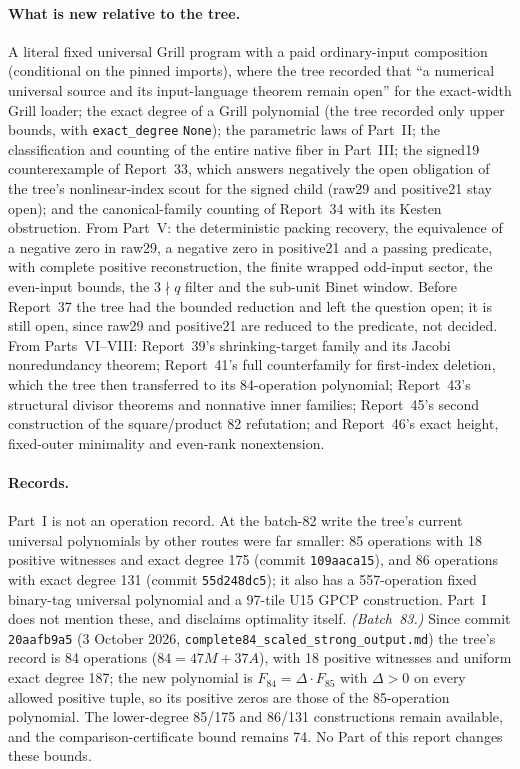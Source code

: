 \documentclass[11pt,letterpaper]{article}
\theoremstyle{definition}\newtheorem{definition}[theorem]{Definition}
\theoremstyle{remark}\newtheorem{remark}[theorem]{Remark}
\newcommand{\rw}[1]{\nolinkurl{#1}}%
\begin{document}
\begin{itemize}
\end{itemize}

\paragraph{What is new relative to the tree.} A literal fixed universal Grill program with a paid ordinary-input composition (conditional on the pinned imports), where the tree recorded that ``a numerical universal source and its input-language theorem remain open'' for the exact-width Grill loader; the exact degree of a Grill polynomial (the tree recorded only upper bounds, with \texttt{exact\_degree} \texttt{None}); the parametric laws of Part~II; the classification and counting of the entire native fiber in Part~III; the signed19 counterexample of Report~33, which answers negatively the open obligation of the tree's nonlinear-index scout for the signed child (raw29 and positive21 stay open); and the canonical-family counting of Report~34 with its Kesten obstruction. From Part~V: the deterministic packing recovery, the equivalence of a negative zero in raw29, a negative zero in positive21 and a passing predicate, with complete positive reconstruction, the finite wrapped odd-input sector, the even-input bounds, the $3\nmid q$ filter and the sub-unit Binet window. Before Report~37 the tree had the bounded reduction and left the question open; it is still open, since raw29 and positive21 are reduced to the predicate, not decided. From Parts~VI--VIII: Report~39's shrinking-target family and its Jacobi nonredundancy theorem; Report~41's full counterfamily for first-index deletion, which the tree then transferred to its 84-operation polynomial; Report~43's structural divisor theorems and nonnative inner families; Report~45's second construction of the square/product 82 refutation; and Report~46's exact height, fixed-outer minimality and even-rank nonextension.

\paragraph{Records.} Part~I is not an operation record. At the batch-82 write the tree's current universal polynomials by other routes were far smaller: 85 operations with 18 positive witnesses and exact degree 175 (commit \texttt{109aaca15}), and 86 operations with exact degree 131 (commit \texttt{55d248dc5}); it also has a 557-operation fixed binary-tag universal polynomial and a 97-tile U15 GPCP construction. Part~I does not mention these, and disclaims optimality itself. \emph{(Batch~83.)} Since commit \texttt{20aafb9a5} (3 October 2026, \rw{complete84_scaled_strong_output.md}) the tree's record is 84 operations ($84=47M+37A$), with 18 positive witnesses and uniform exact degree 187; the new polynomial is $F_{84}=\Delta\cdot F_{85}$ with $\Delta>0$ on every allowed positive tuple, so its positive zeros are those of the 85-operation polynomial. The lower-degree 85/175 and 86/131 constructions remain available, and the comparison-certificate bound remains 74. No Part of this report changes these bounds.
\end{document}
